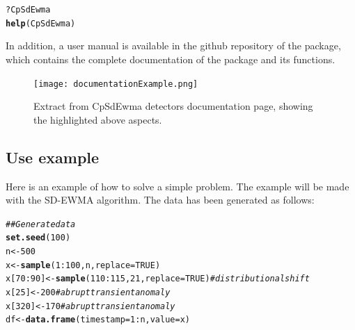\documentclass[a4paper]{article}\usepackage[]{graphicx}\usepackage[]{color}
\makeatletter
\newcommand{\hlnum}[1]{\textcolor[rgb]{0.686,0.059,0.569}{#1}}%
\newcommand{\hlcom}[1]{\textcolor[rgb]{0.678,0.584,0.686}{\textit{#1}}}%
\newcommand{\hlopt}[1]{\textcolor[rgb]{0,0,0}{#1}}%
\newcommand{\hlstd}[1]{\textcolor[rgb]{0.345,0.345,0.345}{#1}}%
\newcommand{\hlkwb}[1]{\textcolor[rgb]{0.69,0.353,0.396}{#1}}%
\newcommand{\hlkwc}[1]{\textcolor[rgb]{0.333,0.667,0.333}{#1}}%
\newcommand{\hlkwd}[1]{\textcolor[rgb]{0.737,0.353,0.396}{\textbf{#1}}}%
\newenvironment{kframe}{%
 \def\at@end@of@kframe{}%
 \ifinner\ifhmode%
  \def\at@end@of@kframe{\end{minipage}}%
  \begin{minipage}{\columnwidth}%
 \fi\fi%
 \def\FrameCommand##1{\hskip\@totalleftmargin \hskip-\fboxsep
 \colorbox{shadecolor}{##1}\hskip-\fboxsep
     \hskip-\linewidth \hskip-\@totalleftmargin \hskip\columnwidth}%
 \MakeFramed {\advance\hsize-\width
   \@totalleftmargin\z@ \linewidth\hsize
   \@setminipage}}%
 {\par\unskip\endMakeFramed%
 \at@end@of@kframe}
\newenvironment{knitrout}{}{} %
\makeatother
\begin{document}
\begin{knitrout}
\color{fgcolor}\begin{kframe}
\begin{alltt}
\hlopt{?}\hlstd{CpSdEwma}
\hlkwd{help}\hlstd{(CpSdEwma)}
\end{alltt}
\end{kframe}
\end{knitrout}

In addition, a user manual is available in the github repository of the   package, which contains the complete documentation of the package and its functions.

\begin{figure}[htbp]
\centering
\texttt{[image: documentationExample.png]}
\caption{Extract from CpSdEwma detectors documentation page, showing the highlighted above aspects.}
\label{fig:documentation}
\end{figure}

\newpage

\subsection{Use example}\label{sec:example}

Here is an example of how to solve a simple problem. The example will be made with the SD-EWMA algorithm. The data has been generated as follows:

\begin{knitrout}
\color{fgcolor}\begin{kframe}
\begin{alltt}
\hlcom{## Generate data}
\hlkwd{set.seed}\hlstd{(}\hlnum{100}\hlstd{)}
\hlstd{n} \hlkwb{<-} \hlnum{500}
\hlstd{x} \hlkwb{<-} \hlkwd{sample}\hlstd{(}\hlnum{1}\hlopt{:}\hlnum{100}\hlstd{, n,} \hlkwc{replace} \hlstd{=} \hlnum{TRUE}\hlstd{)}
\hlstd{x[}\hlnum{70}\hlopt{:}\hlnum{90}\hlstd{]} \hlkwb{<-} \hlkwd{sample}\hlstd{(}\hlnum{110}\hlopt{:}\hlnum{115}\hlstd{,} \hlnum{21}\hlstd{,} \hlkwc{replace} \hlstd{=} \hlnum{TRUE}\hlstd{)} \hlcom{# distributional shift}
\hlstd{x[}\hlnum{25}\hlstd{]} \hlkwb{<-} \hlnum{200} \hlcom{# abrupt transient anomaly}
\hlstd{x[}\hlnum{320}\hlstd{]} \hlkwb{<-} \hlnum{170} \hlcom{# abrupt transient anomaly}
\hlstd{df} \hlkwb{<-} \hlkwd{data.frame}\hlstd{(}\hlkwc{timestamp} \hlstd{=} \hlnum{1}\hlopt{:}\hlstd{n,} \hlkwc{value} \hlstd{= x)}
\end{alltt}
\end{kframe}
\end{knitrout}
\end{document}
